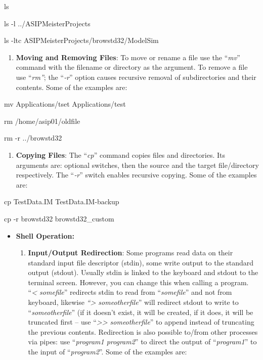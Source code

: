 \documentclass[
]{article}
\begin{document}
ls

ls -l ../ASIPMeisterProjects

ls -ltc ASIPMeisterProjects/browstd32/ModelSim

\begin{enumerate}
\def\labelenumi{\alph{enumi}.}
\setcounter{enumi}{7}
\item
  \textbf{Moving and Removing Files}: To move or rename a file use the
  ``\emph{mv}'' command with the filename or directory as the argument.
  To remove a file use ``\emph{rm''}; the ``\emph{‑r}'' option causes
  recursive removal of subdirectories and their contents. Some of the
  examples are:
\end{enumerate}

mv Applications/tset Applications/test

rm /home/asip01/oldfile

rm -r ../browstd32

\begin{enumerate}
\def\labelenumi{\alph{enumi}.}
\setcounter{enumi}{8}
\item
  \textbf{Copying Files}: The ``\emph{cp}'' command copies files and
  directories. Its arguments are: optional switches, then the source and
  the target file/directory respectively. The ``\emph{‑r}'' switch
  enables recursive copying. Some of the examples are:
\end{enumerate}

cp TestData.IM TestData.IM-backup

cp -r browstd32 browstd32\_custom

\begin{itemize}
\item
  \textbf{Shell Operation:}

  \begin{enumerate}
  \def\labelenumi{\alph{enumi}.}
  \item
    \textbf{Input/Output Redirection}: Some programs read data on their
    standard input file descriptor (stdin), some write output to the
    standard output (stdout). Usually stdin is linked to the keyboard
    and stdout to the terminal screen. However, you can change this when
    calling a program. ``\emph{\textless{} somefile}'' redirects stdin
    to read from ``\emph{somefile}'' and not from keyboard, likewise
    \emph{``\textgreater{} someotherfile}'' will redirect stdout to
    write to ``\emph{someotherfile}'' (if it doesn't exist, it will be
    created, if it does, it will be truncated first -- use
    ``\emph{\textgreater\textgreater{} someotherfile}'' to append
    instead of truncating the previous contents. Redirection is also
    possible to/from other processes via pipes: use ``\emph{program1
    \textbar{} program2}'' to direct the output of ``\emph{program1}''
    to the input of ``\emph{program2}''. Some of the examples are:
  \end{enumerate}
\end{itemize}
\end{document}
